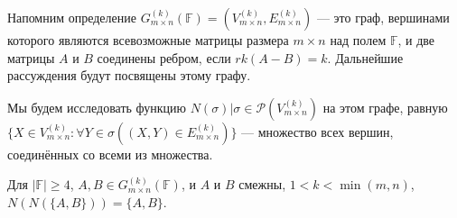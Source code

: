 \documentclass{article}
\begin{document}
Напомним определение $G_{m \times n}^{(k)}(\mathbb{F}) = (V_{m \times n}^{(k)}, E_{m \times n}^{(k)})$ — это граф, вершинами которого являются всевозможные матрицы размера $m \times n$ над полем $\mathbb{F}$, и две матрицы $A$ и $B$ соединены ребром, если $rk(A - B) = k$. Дальнейшие рассуждения будут посвящены этому графу.

Мы будем исследовать функцию $N(\sigma)|\sigma \in \mathcal{P}(V_{m \times n}^{(k)})$ на этом графе, равную $\{X \in V_{m \times n}^{(k)} : \forall Y \in \sigma ((X, Y) \in E_{m \times n}^{(k)})\}$ — множество всех вершин, соединённых со всеми из множества.

\begin{theorem}
Для $|\mathbb{F}| \ge 4$, $A, B \in G_{m \times n}^{(k)}(\mathbb{F})$, и $A$ и $B$ смежны, $1 < k < \min(m,n)$,
$N(N(\{A, B\})) = \{A, B\}$.
\end{theorem}
\end{document}
